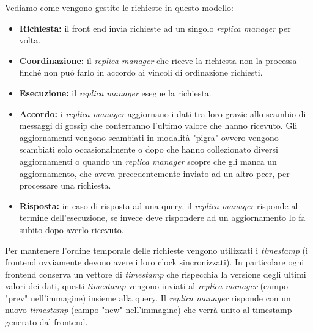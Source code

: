 \documentclass{article}
\begin{document}
Vediamo come vengono gestite le richieste in questo modello:
\begin{itemize}
    \item \textbf{Richiesta:} il front end invia richieste ad un singolo \textit{replica manager} per volta.
    \item \textbf{Coordinazione:} il \textit{replica manager} che riceve la richiesta non la processa finché non può farlo in accordo ai vincoli di ordinazione richiesti.
    \item \textbf{Esecuzione:} il \textit{replica manager} esegue la richiesta.
    \item \textbf{Accordo:} i \textit{replica manager} aggiornano i dati tra loro grazie allo scambio di messaggi di gossip che conterranno l'ultimo valore che hanno ricevuto. Gli aggiornamenti vengono scambiati in modalità "pigra" ovvero vengono scambiati solo occasionalmente o dopo che hanno collezionato diversi aggiornamenti o quando un \textit{replica manager} scopre che gli manca un aggiornamento, che aveva precedentemente inviato ad un altro peer, per processare una richiesta. 
    \item \textbf{Risposta:} in caso di risposta ad una query, il \textit{replica manager} risponde al termine dell'esecuzione, se invece deve rispondere ad un aggiornamento lo fa subito dopo averlo ricevuto.
\end{itemize}
Per mantenere l'ordine temporale delle richieste vengono utilizzati i \textit{timestamp} (i frontend ovviamente devono avere i loro clock sincronizzati). In particolare ogni frontend conserva un vettore di \textit{timestamp} che rispecchia la versione degli ultimi valori dei dati, questi \textit{timestamp} vengono inviati al \textit{replica manager} (campo "prev" nell'immagine) insieme alla query. Il \textit{replica manager} risponde con un nuovo \textit{timestamp} (campo "new" nell'immagine) che verrà unito al timestamp generato dal frontend.
\end{document}

